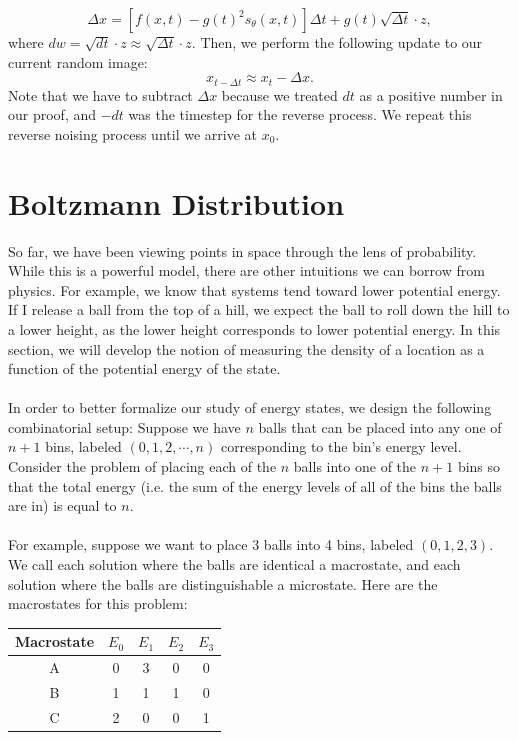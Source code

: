 \documentclass{article}
\begin{document}
\[\Delta x= [f(x,t)-g(t)^2s_\theta (x,t)]\Delta t + g(t) \sqrt{\Delta t} \cdot z,\]
where $dw=\sqrt{dt} \cdot z\approx \sqrt{\Delta t} \cdot z$. Then, we perform the following update to our current random image:
\[x_{t-\Delta t}\approx x_t - \Delta x.\]
Note that we have to subtract $\Delta x$ because we treated $dt$ as a positive number in our proof, and $-dt$ was the timestep for the reverse process. We repeat this reverse noising process until we arrive at $x_0$.


\section{Boltzmann Distribution}
So far, we have been viewing points in space through the lens of probability. While this is a powerful model, there are other intuitions we can borrow from physics. For example, we know that systems tend toward lower potential energy. If I release a ball from the top of a hill, we expect the ball to roll down the hill to a lower height, as the lower height corresponds to lower potential energy. In this section, we will develop the notion of measuring the density of a location as a function of the potential energy of the state. 
\\
\\
In order to better formalize our study of energy states, we design the following combinatorial setup: Suppose we have $n$ balls that can be placed into any one of $n+1$ bins, labeled $(0,1,2,\cdots,n)$ corresponding to the bin's energy level. Consider the problem of placing each of the $n$ balls into one of the $n+1$ bins so that the total energy (i.e. the sum of the energy levels of all of the bins the balls are in) is equal to $n$. 
\\
\\
For example, suppose we want to place 3 balls into 4 bins, labeled $(0,1,2,3)$. We call each solution where the balls are identical a macrostate, and each solution where the balls are distinguishable a microstate. Here are the macrostates for this problem:
\begin{table}[H]
    \centering
    \begin{tabular}{|c|c|c|c|c|}
        \hline
        Macrostate & $E_0$ & $E_1$ & $E_2$ & $E_3$  \\
        \hline 
        A & 0 & 3 & 0 & 0  \\
        \hline 
        B & 1 & 1 & 1 & 0  \\
        \hline 
        C & 2 & 0 & 0 & 1  \\
        \hline 
    \end{tabular}
\end{table}
\end{document}
